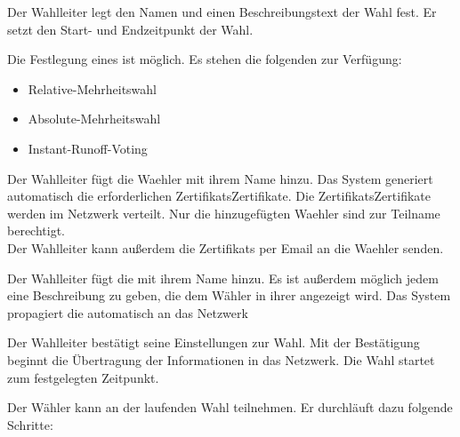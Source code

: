\documentclass[parskip=full,11pt,twoside]{scrartcl}
\begin{document}
Der \gls{Wahlleiter} legt den Namen und einen Beschreibungstext der \gls{Wahl} fest.
Er setzt den Start- und Endzeitpunkt der Wahl.

Die Festlegung eines  ist möglich. Es stehen die folgenden zur Verfügung:
\begin{itemize}
	\item \gls{Relative-Mehrheitswahl}
	\item \gls{Absolute-Mehrheitswahl}
	\item \gls{Instant-Runoff-Voting}
\end{itemize}

Der \gls{Wahlleiter} fügt die \gls{Waehler} mit ihrem Name hinzu. Das System generiert automatisch die erforderlichen \glspl{Zertifikat}{Zertifikate}. Die \glspl{Zertifikat}{Zertifikate} werden im Netzwerk verteilt. Nur die hinzugefügten \gls{Waehler} sind zur Teilname berechtigt. \\
Der \gls{Wahlleiter} kann außerdem die \glspl{Zertifikat} per Email an die \gls{Waehler} senden. %

Der \gls{Wahlleiter} fügt die  mit ihrem Name hinzu. Es ist außerdem möglich jedem  eine Beschreibung zu geben, die dem Wähler in ihrer  angezeigt wird. Das System propagiert die  automatisch an das Netzwerk

Der \gls{Wahlleiter} bestätigt seine Einstellungen zur Wahl. Mit der Bestätigung beginnt die Übertragung der Informationen in das Netzwerk. Die \gls{Wahl} startet zum festgelegten Zeitpunkt.

Der Wähler kann an der laufenden Wahl teilnehmen. Er durchläuft dazu folgende Schritte:
\end{document}
